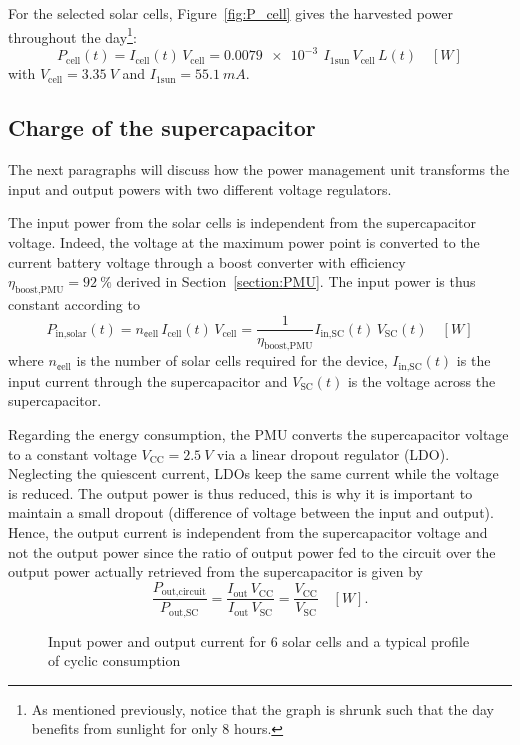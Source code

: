 \documentclass{EPL-master-thesis-covers-EN}
\newcommand{\te}[1]{\textrm{#1}}
\begin{document}
For the selected solar cells, Figure~\ref{fig:P_cell} gives the harvested power throughout the day\footnote{As mentioned previously, notice that the graph is shrunk such that the day benefits from sunlight for only 8 hours.}: 
\[
 P_\te{cell}(t) = I_\te{cell}(t)\,V_\te{cell} = \SI{0.0079e-3}{}\,I_{1\te{sun}}\,V_\te{cell}\,L(t) \quad \si{[W]}
\]
with $V_\te{cell} = \SI{3.35}{V}$ and $I_{1\te{sun}} = \SI{55.1}{mA}$.

\subsection*{Charge of the supercapacitor}

The next paragraphs will discuss how the power management unit transforms the input and output powers with two different voltage regulators.

The input power from the solar cells is independent from the supercapacitor voltage. Indeed, the voltage at the maximum power point is converted to the current battery voltage through a boost converter with efficiency $\eta_\te{boost,PMU}=\SI{92}{\%}$ derived in Section~\ref{section:PMU}. The input power is thus constant according to
\[
 P_\te{in,solar}(t) = n_\te{¢ell} \, I_\te{cell}(t)\,V_\te{cell} = \frac{1}{\eta_\te{boost,PMU}} I_\te{in,SC}(t) \, V_\te{SC}(t) \quad [\si{W}]
\]
where $n_\te{¢ell}$ is the number of solar cells required for the device, $I_\te{in,SC}(t)$ is the input current through the supercapacitor and $V_\te{SC}(t)$ is the voltage across the supercapacitor.

Regarding the energy consumption, the PMU converts the supercapacitor voltage to a constant voltage $V_\te{CC}= \SI{2.5}{V}$ via a linear dropout regulator (LDO). Neglecting the quiescent current, LDOs keep the same current while the voltage is reduced. The output power is thus reduced, this is why it is important to maintain a small dropout (difference of voltage between the input and output). Hence, the output current is independent from the supercapacitor voltage and not the output power since the ratio of output power fed to the circuit over the output power actually retrieved from the supercapacitor is given by
\[
 \frac{P_\te{out,circuit}}{P_\te{out,SC}} = \frac{I_\te{out} \, V_\te{CC}}{I_\te{out} \, V_\te{SC}} = \frac{V_\te{CC}}{V_\te{SC}} \quad [\si{W}].
\]

\begin{figure}[H]
    \centering
    
    \caption{Input power and output current for 6 solar cells and a typical profile of cyclic consumption}
    \label{fig:P_in_I_out}
\end{figure}
\end{document}
